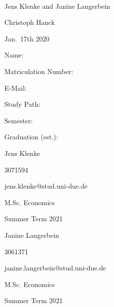 \documentclass[12pt,a4paper]{article}
\begin{document}
\begin{titlepage}
\begin{center}
  \vspace{0.75cm}
  \large{}\\
  \vspace{0.5cm}
  Jens Klenke and Janine Langerbein\\
  \end{center}
  \vfill
  \hrulefill

  \noindent\begin{minipage}[t]{0.3\textwidth}
  \end{minipage}
  \begin{minipage}[t]{0.7\textwidth}
  \hspace{1cm}Christoph Hanck
  \end{minipage}

  \noindent\begin{minipage}[t]{0.3\textwidth}
  \end{minipage}
  \begin{minipage}[t]{0.7\textwidth}
  \hspace{1cm}Jan.~17th 2020
  \end{minipage}

  \hrulefill

  \begin{multicols}{3}
  
  \begin{scriptsize}
  
  Name:

  Matriculation Number:

  E-Mail:

  Study Path:

  Semester:

  Graduation (est.):
 
  \columnbreak

  Jens Klenke

  3071594
  
  jens.klenke@stud.uni-due.de

  M.Sc. Economics


  Summer Term 2021
  
  \columnbreak
  
  Janine Langerbein

  3061371
  
  janine.langerbein@stud.uni-due.de

  M.Sc. Economics


  Summer Term 2021
  
  \end{scriptsize}
  
  \end{multicols}
  
  

\end{titlepage}
\end{document}
